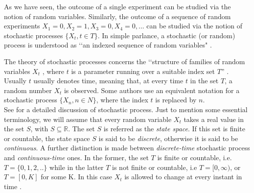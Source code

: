 \documentclass[\main/main.tex]{subfiles}
\begin{document}
\noindent As we have seen, the outcome of a single experiment can be studied via the notion of random variables.  Similarly, the outcome of a sequence of random experiments $X_1 = 0, X_2 = 1, X_3 = 0, X_4 = 0, ... $ can be studied via the notion of stochastic processes $  \{ X_t, t \in T\}$.  In simple parlance, a stochastic (or random) process is understood as \lq\lq an indexed sequence of random variables" \citep{Ching2006}.

The theory of stochastic processes concerns the \lq\lq structure of families of
random variables $X_t$ , where $t$ is a parameter running over a suitable index set $T$'' \citep{Karlin1975}.
Usually $t$ usually denotes time, meaning that, at every time $t$ in the set $T$, a random number $X_t$ is observed.
Some authors use an equivalent notation for a stochastic process $\{X_n, n \in N\}$, where the index $t$ is replaced by $n$.\\


See \cite{Karlin1975} for a detailed discussion of stochastic process. Just to mention some essential terminology, we will assume that every random variable $X_t$ takes a real value in the set $S$, with $S \subseteq \mathds{R}$. The set $S$ is referred as the \textit{state space}. If this set is finite or countable, the state space $S$ is said to be \textit{discrete}, otherwise it is said to be \textit{continuous}. A further distinction is made between \textit{discrete-time} stochastic process and \textit{continuous-time} ones. In the former, the set $T$ is finite or countable, i.e. $T = \{ 0,1,2,..\}$ while in the latter $T$ is not finite or countable, i.e $T = [0,\infty)$, or $T = [0,K]$ for some K. In this case $X_t$ is allowed to change at every instant in time \citep{Holmes2015}.




\end{document}
